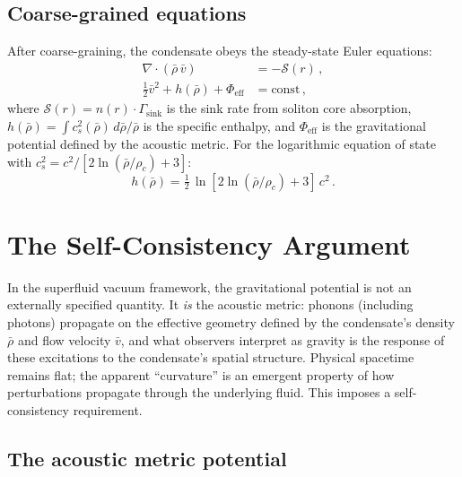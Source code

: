 \documentclass[12pt, a4paper]{article}
\newcommand{\rhob}{\bar{\rho}}
\newcommand{\vb}{\bar{v}}
\newcommand{\Phieff}{\Phi_{\mathrm{eff}}}
\begin{document}
\newpage
\subsection{Coarse-grained equations}

After coarse-graining, the condensate obeys the steady-state Euler equations:
\begin{align}
    \nabla\cdot(\rhob\,\vb) &= -\mathcal{S}(r)\,,
\label{eq:cg_continuity}\\
    \tfrac{1}{2}\vb^2 + h(\rhob) + \Phieff &= \text{const}\,,
\label{eq:cg_bernoulli}
\end{align}
where $\mathcal{S}(r) = n(r)\cdot\Gamma_{\mathrm{sink}}$ is the sink rate from soliton core absorption, $h(\rhob) = \int c_s^2(\rhob)\,d\rhob/\rhob$ is the specific enthalpy, and $\Phieff$ is the gravitational potential defined by the acoustic metric. For the logarithmic equation of state~\cite{barcelo_2005,kulangiev_2026} with $c_s^2 = c^2 / [2\ln(\rhob/\rho_c)+3]$:
\begin{equation}
    h(\rhob) = \tfrac{1}{2}\,\ln\!\left[2\ln(\rhob/\rho_c) + 3\right]\,c^2\,.
\end{equation}


\section{The Self-Consistency Argument}
\label{sec:self_consistency}

In the superfluid vacuum framework, the gravitational potential is not an externally specified quantity. It \emph{is} the acoustic metric: phonons (including photons) propagate on the effective geometry defined by the condensate's density $\rhob$ and flow velocity $\vb$, and what observers interpret as gravity is the response of these excitations to the condensate's spatial structure. Physical spacetime remains flat; the apparent ``curvature'' is an emergent property of how perturbations propagate through the underlying fluid. This imposes a self-consistency requirement.

\subsection{The acoustic metric potential}
\end{document}
